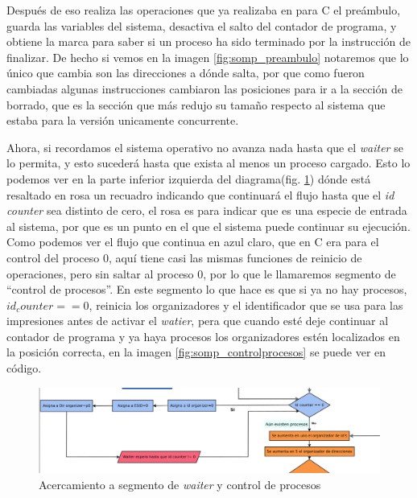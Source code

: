 \documentclass[letterpaper,12pt,oneside]{book}
\begin{document}
				Después de eso realiza las operaciones que ya realizaba en para C el preámbulo, guarda las variables del sistema, desactiva
				el salto del contador de programa, y obtiene la marca para saber si un proceso ha sido terminado por la instrucción de finalizar. De hecho
				si vemos en la imagen \ref{fig:somp_preambulo} notaremos que lo único que cambia son las direcciones a dónde salta, por que como fueron
				cambiadas algunas instrucciones cambiaron las posiciones para ir a la sección de borrado, que es la sección que más redujo su tamaño
				respecto al sistema que estaba para la versión unicamente concurrente.
			
			
				Ahora, si recordamos el sistema operativo no avanza nada hasta que el \textit{waiter} se lo permita, y esto sucederá hasta que
				exista al menos un proceso cargado. Esto lo podemos ver en la parte inferior izquierda del diagrama(fig. \ref{fig:diag_somp_waiter}) dónde
				está resaltado en rosa un recuadro indicando que continuará el flujo hasta que el \textit{id counter} sea distinto de cero, el
				rosa es para indicar que es una especie de entrada al sistema, por que es un punto en el que el sistema puede continuar su ejecución. Como
				podemos ver el flujo que continua en azul claro, que en C era para el control del proceso 0, aquí tiene casi las mismas funciones de
				reinicio de operaciones, pero sin saltar al proceso 0, por lo que le llamaremos segmento de ``control de procesos''. En este segmento
				lo que hace es que si ya no hay procesos, $id_counter == 0 $, reinicia los organizadores y el identificador que se usa para las impresiones  antes
				de activar el \textit{watier}, pera que cuando esté deje continuar al contador de programa y ya haya procesos
				los organizadores estén localizados en la posición correcta, en la imagen \ref{fig:somp_controlprocesos} se puede ver en código.
			
			
			\begin{figure}[h]		
				\centering
				\includegraphics[scale=0.45]{media/Paralela/diag_somp_waiter.png}
				\caption{ Acercamiento a segmento de  \textit{waiter} y control de procesos}
				\label{fig:diag_somp_waiter}
			\end{figure}	
			
\end{document}
